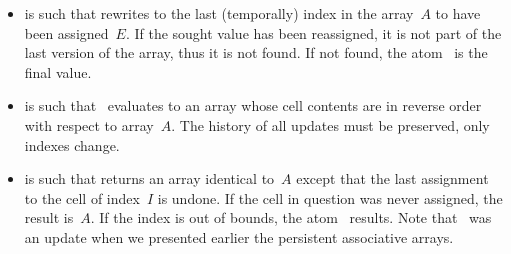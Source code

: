 \begin{enumerate}
\begin{itemize}
      \item {} is such that 
        rewrites to the last (temporally) index in the array~\(A\) to
        have been assigned~\(E\). If the sought value has been
        reassigned, it is not part of the last version of the array,
        thus it is not found. If not found, the atom~
        is the final value.

      \item {} is such that
        ~evaluates to an array whose cell contents
        are in reverse order with respect to array~\(A\). The history
        of all updates must be preserved, only indexes change.

      \item {} is such that
         returns an array identical
        to~\(A\) except that the last assignment to the cell of
        index~\(I\) is undone. If the cell in question was never
        assigned, the result is~\(A\). If the index is out of bounds,
        the atom~ results. Note that~ was
        an update when we presented earlier the persistent associative
        arrays.

    \end{itemize}

\end{enumerate}



